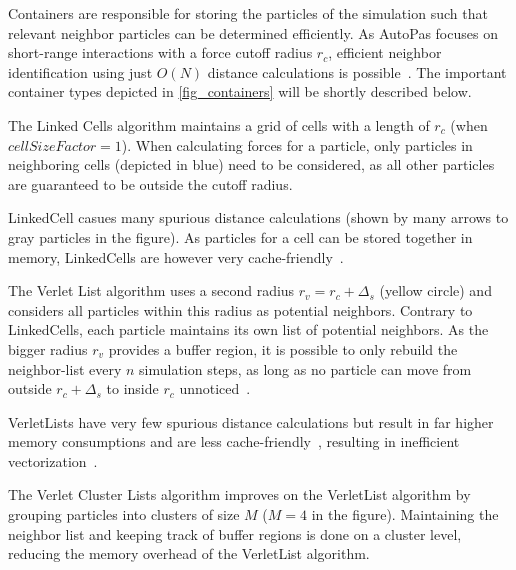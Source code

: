 \documentclass[conference]{IEEEtran}
\begin{document}
\begin{description}[style=nextline]
    \item[Container]

        Containers are responsible for storing the particles of the simulation such that relevant neighbor particles can be determined efficiently. As AutoPas focuses on short-range interactions with
        a force cutoff radius $r_c$, efficient neighbor identification using just $O(N)$ distance calculations is possible~\cite{Gratl2019AutoPas}. The important container types depicted in \autoref{fig_containers} will be shortly described below.

        \begin{description}[style=nextline, font=\itshape]
            \item[$\bullet$ Linked Cells]
                The Linked Cells algorithm maintains a grid of cells with a length of $r_c$ (when $cellSizeFactor = 1$). When calculating forces for a particle, only particles in neighboring cells (depicted in blue) need to be considered, as all other particles are guaranteed to be outside the cutoff radius.

                LinkedCell casues many spurious distance calculations (shown by many arrows to gray particles in the figure). As particles for a cell can be stored together in memory, LinkedCells are however very cache-friendly~\cite{Gratl2022AutoPas}.

            \item[$\bullet$ Verlet Lists]
                The Verlet List algorithm uses a second radius $r_v = {r_c} + \Delta_s$ (yellow circle) and considers all particles within this radius as potential neighbors. Contrary to LinkedCells, each particle maintains its own list of potential neighbors. As the bigger radius $r_v$ provides a buffer region, it is possible to only rebuild the neighbor-list every $n$ simulation steps, as long as no particle can move from outside $r_c + \Delta_s$ to inside $r_c$ unnoticed~\cite{NEWCOME2023115278}.

                VerletLists have very few spurious distance calculations but result in far higher memory consumptions and are less cache-friendly~\cite{Gratl2022AutoPas}, resulting in inefficient vectorization~\cite{PALL20132641}.

            \item[$\bullet$ Verlet Cluster Lists]
                The Verlet Cluster Lists algorithm improves on the VerletList algorithm by grouping particles into clusters of size $M$ ($M=4$ in the figure). Maintaining the neighbor list and keeping track of buffer regions is done on a cluster level, reducing the memory overhead of the VerletList algorithm.


\end{description}
\end{description}
\end{document}
